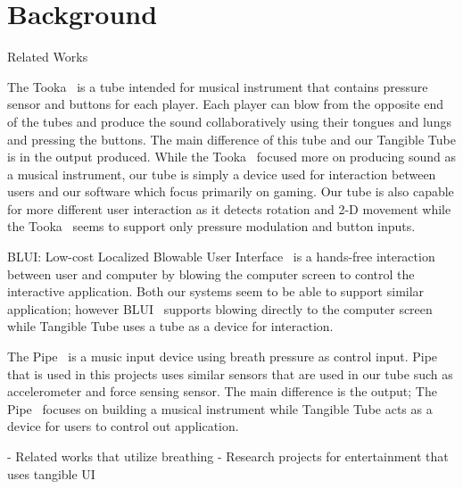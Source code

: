 \section{Background}\label{sec:background}

Related Works

The Tooka~\cite{tooka} is a tube intended for musical instrument that contains pressure sensor and buttons for each player. Each player can blow from the opposite end of the tubes and produce the sound collaboratively using their tongues and lungs and pressing the buttons. The main difference of this tube and our Tangible Tube is in the output produced. While the Tooka~\cite{tooka} focused more on producing sound as a musical instrument, our tube is simply a device used for interaction between users and our software which focus primarily on gaming. Our tube is also capable for more different user interaction as it detects rotation and 2-D movement while the Tooka~\cite{tooka} seems to support only pressure modulation and button inputs.

BLUI: Low-cost Localized Blowable User Interface~\cite{blui} is a hands-free interaction between user and computer by blowing the computer screen to control the interactive application. Both our systems seem to be able to support similar application; however BLUI~\cite{blui} supports blowing directly to the computer screen while Tangible Tube uses a tube as a device for interaction.

The Pipe~\cite{thepipe} is a music input device using breath pressure as control input. Pipe that is used in this projects uses similar sensors that are used in our tube such as accelerometer and force sensing sensor. The main difference is the output; The Pipe~\cite{thepipe} focuses on building a musical instrument while Tangible Tube acts as a device for users to control out application.


\TODO
- Related works that utilize breathing \newline
- Research projects for entertainment that uses tangible UI
